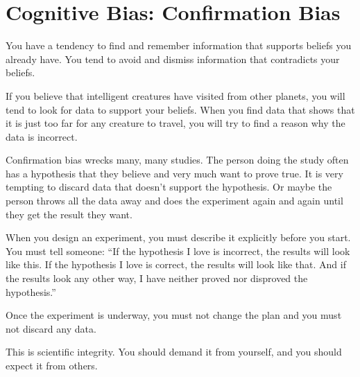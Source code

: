\section{Cognitive Bias: Confirmation Bias}

You have a tendency to find and remember information that supports
beliefs you already have. You tend to avoid and dismiss information
that contradicts your beliefs.

If you believe that intelligent creatures have visited from other
planets, you will tend to look for data to support your beliefs. When
you find data that shows that it is just too far for any creature to
travel, you will try to find a reason why the data is incorrect.

Confirmation bias wrecks many, many studies. The person doing the
study often has a hypothesis that they believe and very much want to
prove true. It is very tempting to discard data that doesn't support
the hypothesis. Or maybe the person throws all the data away and does
the experiment again and again until they get the result they want.

When you design an experiment, you must describe it explicitly before
you start. You must tell someone: ``If the hypothesis I love is
incorrect, the results will look like this.  If the hypothesis I love
is correct, the results will look like that. And if the results look
any other way, I have neither proved nor disproved the hypothesis.''

Once the experiment is underway, you must not change the plan and you
must not discard any data.

This is scientific integrity. You should demand it from yourself, and
you should expect it from others.
